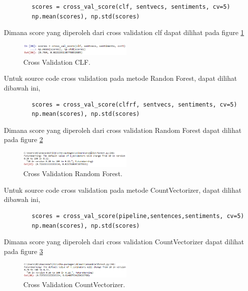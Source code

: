 \begin{enumerate}
	\begin{verbatim}
		scores = cross_val_score(clf, sentvecs, sentiments, cv=5)
		np.mean(scores), np.std(scores)
	\end{verbatim}

		    Dimana score yang diperoleh dari cross validation clf dapat dilihat pada figure \ref{YNC5-30}

	\begin{figure}[!htbp]
		\centerline{\includegraphics[width=0.5\textwidth]{figures/YN/Chapter5/Praktek/YNC5-30.PNG}}
		\caption{Cross Validation CLF.}
		\label{YNC5-30}
	\end{figure}

	\subitem Untuk source code cross validation pada metode Randon Forest, dapat dilihat dibawah ini,

	\begin{verbatim}
		scores = cross_val_score(clfrf, sentvecs, sentiments, cv=5)
		np.mean(scores), np.std(scores)
	\end{verbatim}

		  Dimana score yang diperoleh dari cross validation Random Forest dapat dilihat pada figure \ref{YNC5-31}

	\begin{figure}[!htbp]
		\centerline{\includegraphics[width=0.5\textwidth]{figures/YN/Chapter5/Praktek/YNC5-31.PNG}}
		\caption{Cross Validation Random Forest.}
		\label{YNC5-31}
	\end{figure}	

	\subitem Untuk source code cross validation pada metode CountVectorizer, dapat dilihat dibawah ini,

	\begin{verbatim}
		scores = cross_val_score(pipeline,sentences,sentiments, cv=5)
		np.mean(scores), np.std(scores)
	\end{verbatim}

		  Dimana score yang diperoleh dari cross validation CountVectorizer dapat dilihat pada figure \ref{YNC5-32}

	\begin{figure}[!htbp]
		\centerline{\includegraphics[width=0.5\textwidth]{figures/YN/Chapter5/Praktek/YNC5-32.PNG}}
		\caption{Cross Validation CountVectorizer.}
		\label{YNC5-32}
	\end{figure}	

\end{enumerate}

